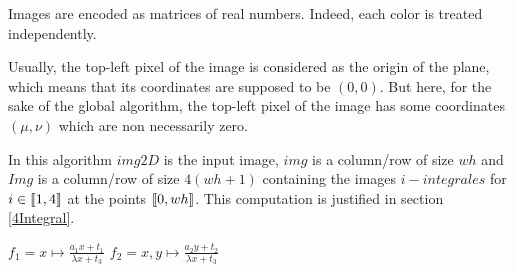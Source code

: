 


Images are encoded as matrices of real numbers. Indeed, each color is treated independently.

Usually, the top-left pixel of the image is considered as the origin of the plane, which means that its coordinates are supposed to be $(0,0)$. But here, for the sake of the global algorithm, the top-left pixel of the image has some coordinates $(\mu,\nu)$ which are non necessarily zero.



In this algorithm $img2D$ is the input image, $img$ is a column/row of size $wh$ and $Img$ is a column/row of size $4(wh+1)$ containing the images $i-integrales$ for $i\in \llbracket 1,4 \rrbracket $ at the points $\llbracket 0,wh \rrbracket$. This computation is justified in section \ref{4Integral}.



\begin{algorithm}[H]
\caption{$applyHomography(img,imgf,H)$}
$f_1 = x\mapsto \frac{a_1x + t_1}{\lambda x + t_3}$ \;
$f_2 = x,y\mapsto \frac{a_2y + t_2}{\lambda x + t_3}$ \;

\end{algorithm}


